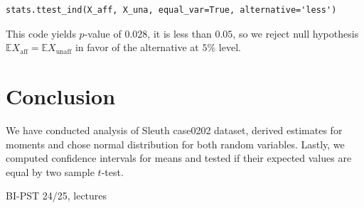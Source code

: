 \documentclass[12pt,a4paper]{article} %
\newcommand{\randv}[2][X]{#1_{\text{#2}}}
\newcommand{\E}{\mathbb{E}}
\begin{document}
\begin{lstlisting}
stats.ttest_ind(X_aff, X_una, equal_var=True, alternative='less')
\end{lstlisting}

This code yields $p$-value of $0.028$, it is less than $0.05$, so we reject null hypothesis $\E\randv{aff} = \E\randv{unaff}$ in favor of the alternative at $5\%$ level.

\section{Conclusion}
We have conducted analysis of Sleuth case0202 dataset, derived estimates for moments and chose normal distribution for both random variables. Lastly, we computed confidence intervals for means and tested if their expected values are equal by two sample $t$-test.


\begin{thebibliography}{99}
 BI-PST 24/25, lectures
\end{thebibliography}
\end{document}
